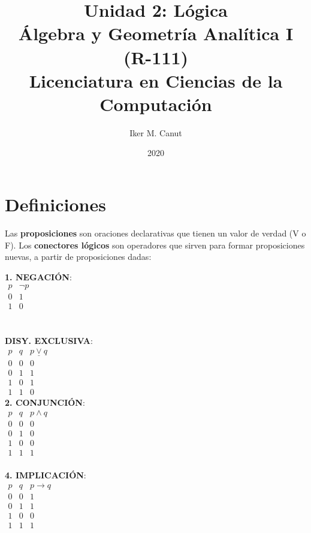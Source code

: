 \documentclass[11pt,a4paper]{article}
\author{Iker M. Canut}
\title{Unidad 2: L\'ogica\\\'Algebra y Geometr\'ia Anal\'itica I (R-111)\\Licenciatura en Ciencias de la Computaci\'on}
\date{2020}
\begin{document}
\maketitle
\newpage

\section{Definiciones}
\noindent Las \textbf{proposiciones} son oraciones declarativas que tienen un valor de verdad (V o F). Los \textbf{conectores l\'ogicos} son operadores que sirven para formar proposiciones nuevas, a partir de proposiciones dadas:
\begin{multicols}{3}
\noindent \textbf{1. NEGACI\'ON}:\\

\indent $\begin{array}{|c|c|}
p & \lnot p\\
\hline
0 & 1 \\
1 & 0
\end{array}$\\ \\ \\

\noindent \textbf{DISY. EXCLUSIVA}: \\
\indent $\begin{array}{|cc|c|}
p & q & p \underline{\lor} q\\
\hline
0 & 0 & 0\\
0 & 1 & 1\\
1 & 0 & 1\\
1 & 1 & 0
\end{array}$\\

\noindent \textbf{2. CONJUNCI\'ON}:\\
\indent $\begin{array}{|cc|c|}
p & q & p \land q\\
\hline
0 & 0 & 0\\
0 & 1 & 0\\
1 & 0 & 0\\
1 & 1 & 1
\end{array}$\\ \\

\noindent \textbf{4. IMPLICACI\'ON}: \\
\indent $\begin{array}{|cc|c|}
p & q & p \rightarrow q\\
\hline
0 & 0 & 1\\
0 & 1 & 1\\
1 & 0 & 0\\
1 & 1 & 1
\end{array}$\\


\end{multicols}
\end{document}
